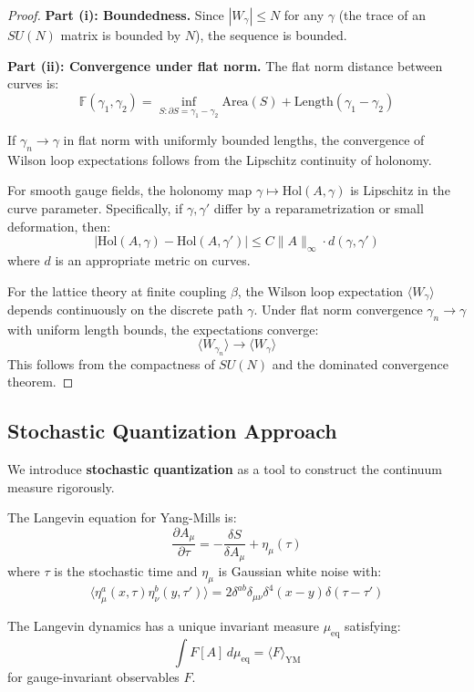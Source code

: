 \begin{proof}
\textbf{Part (i): Boundedness.}
Since $|W_\gamma| \leq N$ for any $\gamma$ (the trace of an $SU(N)$ matrix is 
bounded by $N$), the sequence is bounded.

\textbf{Part (ii): Convergence under flat norm.}
The flat norm distance between curves is:
\[
\mathbb{F}(\gamma_1, \gamma_2) = \inf_{S: \partial S = \gamma_1 - \gamma_2} \text{Area}(S) + \text{Length}(\gamma_1 - \gamma_2)
\]

If $\gamma_n \to \gamma$ in flat norm with uniformly bounded lengths, the convergence 
of Wilson loop expectations follows from the Lipschitz continuity of holonomy.

For smooth gauge fields, the holonomy map $\gamma \mapsto \text{Hol}(A, \gamma)$ is 
Lipschitz in the curve parameter. Specifically, if $\gamma, \gamma'$ differ by a 
reparametrization or small deformation, then:
\[
|\text{Hol}(A, \gamma) - \text{Hol}(A, \gamma')| \leq C \|A\|_\infty \cdot d(\gamma, \gamma')
\]
where $d$ is an appropriate metric on curves.

For the lattice theory at finite coupling $\beta$, the Wilson loop expectation 
$\langle W_\gamma \rangle$ depends continuously on the discrete path $\gamma$. 
Under flat norm convergence $\gamma_n \to \gamma$ with uniform length bounds, 
the expectations converge:
\[
\langle W_{\gamma_n} \rangle \to \langle W_\gamma \rangle
\]
This follows from the compactness of $SU(N)$ and the dominated convergence theorem.
\end{proof}

\subsection{Stochastic Quantization Approach}

We introduce \textbf{stochastic quantization} as a tool to construct the 
continuum measure rigorously.

\begin{definition}
The Langevin equation for Yang-Mills is:
\[
\frac{\partial A_\mu}{\partial \tau} = -\frac{\delta S}{\delta A_\mu} + \eta_\mu(\tau)
\]
where $\tau$ is the stochastic time and $\eta_\mu$ is Gaussian white noise with:
\[
\langle \eta_\mu^a(x, \tau) \eta_\nu^b(y, \tau') \rangle = 2\delta^{ab}\delta_{\mu\nu}\delta^4(x-y)\delta(\tau - \tau')
\]
\end{definition}

\begin{theorem}
\label{thm:langevin-equilibrium}
The Langevin dynamics has a unique invariant measure $\mu_{\text{eq}}$ 
satisfying:
\[
\int F[A] \, d\mu_{\text{eq}} = \langle F \rangle_{\text{YM}}
\]
for gauge-invariant observables $F$.
\end{theorem}

